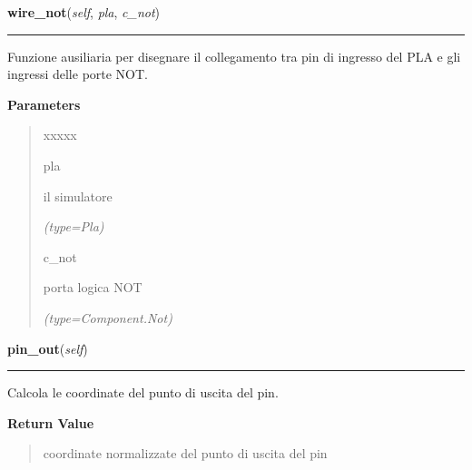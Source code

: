 \hspace{.8\funcindent}\begin{boxedminipage}{\funcwidth}

    \raggedright \textbf{wire\_not}(\textit{self}, \textit{pla}, \textit{c\_not})

    \vspace{-1.5ex}

    \rule{\textwidth}{0.5\fboxrule}
\setlength{\parskip}{2ex}
    Funzione ausiliaria per disegnare il collegamento tra pin di ingresso 
    del PLA e gli ingressi delle porte NOT.

\setlength{\parskip}{1ex}
      \textbf{Parameters}
      \vspace{-1ex}

      \begin{quote}
        \begin{Ventry}{xxxxx}

          \item[pla]

          il simulatore

            {\it (type=Pla)}

          \item[c\_not]

          porta logica NOT

            {\it (type=Component.Not)}

        \end{Ventry}

      \end{quote}

    \end{boxedminipage}

    \label{component:InPin:pin_out}

    \vspace{0.5ex}

\hspace{.8\funcindent}\begin{boxedminipage}{\funcwidth}

    \raggedright \textbf{pin\_out}(\textit{self})

    \vspace{-1.5ex}

    \rule{\textwidth}{0.5\fboxrule}
\setlength{\parskip}{2ex}
    Calcola le coordinate del punto di uscita del pin.

\setlength{\parskip}{1ex}
      \textbf{Return Value}
    \vspace{-1ex}

      \begin{quote}
      coordinate normalizzate del punto di uscita del pin

      \end{quote}

    \end{boxedminipage}


